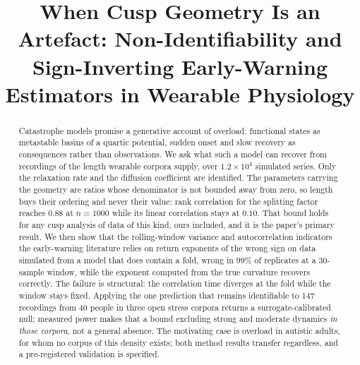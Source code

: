 \documentclass[conference]{IEEEtran}
\begin{document}
\title{When Cusp Geometry Is an Artefact: Non-Identifiability and
Sign-Inverting Early-Warning Estimators in Wearable Physiology}

\author{
}


\maketitle

\begin{abstract}
Catastrophe models promise a generative account of overload: functional states
as metastable basins of a quartic potential, sudden onset and slow recovery as
consequences rather than observations. We ask what such a model can recover
from recordings of the length wearable corpora supply, over $1.2\times10^{4}$
simulated series. Only the relaxation rate and the diffusion
coefficient are identified. The parameters carrying the geometry are ratios
whose denominator is not bounded away from zero, so length buys their ordering
and never their value: rank correlation for the splitting factor reaches $0.88$
at $n=1000$ while its linear correlation stays at $0.10$. That bound holds for
any cusp analysis of data of this kind, ours included, and it is the paper's
primary result. We then show that the rolling-window variance and autocorrelation indicators
the early-warning literature relies on return exponents of the wrong sign on
data simulated from a model that does contain a fold, wrong in $99\%$ of
replicates at a 30-sample window, while the exponent computed from the true
curvature recovers correctly. The failure is structural: the correlation time
diverges at the fold while the window stays fixed. Applying the one prediction that remains identifiable to 147 recordings from
40 people in three open stress corpora returns a surrogate-calibrated null;
measured power makes that a bound excluding strong and moderate dynamics
\emph{in those corpora}, not a general absence. The motivating case is overload in autistic adults, for whom no corpus of this
density exists; both method results transfer regardless, and a pre-registered
validation is specified.
\end{abstract}
\end{document}
